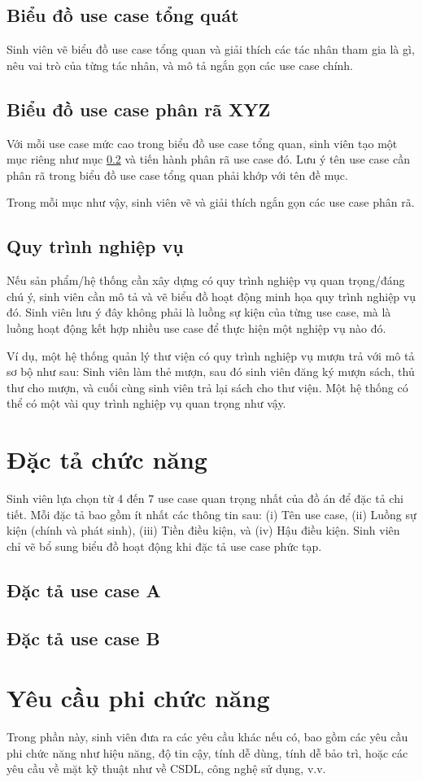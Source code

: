 \documentclass[../DoAn.tex]{subfiles}
\begin{document}
\subsection{Biểu đồ use case tổng quát}
\label{subsection:2.2.1}
Sinh viên vẽ biểu đồ use case tổng quan và giải thích các tác nhân tham gia là gì, nêu vai trò của từng tác nhân, và mô tả ngắn gọn các use case chính.

\subsection{Biểu đồ use case phân rã XYZ}
\label{subsection:2.2.2}
Với mỗi use case mức cao trong biểu đồ use case tổng quan, sinh viên tạo một mục riêng như mục \ref{subsection:2.2.2} và tiến hành phân rã use case đó. Lưu ý tên use case cần phân rã trong biểu đồ use case tổng quan phải khớp với tên đề mục.

Trong mỗi mục như vậy, sinh viên vẽ và giải thích ngắn gọn các use case phân rã.

\subsection{Quy trình nghiệp vụ}
\label{subsection:2.2.3}
Nếu sản phẩm/hệ thống cần xây dựng có quy trình nghiệp vụ quan trọng/đáng chú ý, sinh viên cần mô tả và vẽ biểu đồ hoạt động minh họa quy trình nghiệp vụ đó. Sinh viên lưu ý đây không phải là luồng sự kiện của từng use case, mà là luồng hoạt động kết hợp nhiều use case để thực hiện một nghiệp vụ nào đó.

Ví dụ, một hệ thống quản lý thư viện có quy trình nghiệp vụ mượn trả với mô tả sơ bộ như sau: Sinh viên làm thẻ mượn, sau đó sinh viên đăng ký mượn sách, thủ thư cho mượn, và cuối cùng sinh viên trả lại sách cho thư viện. Một hệ thống có thể có một vài quy trình nghiệp vụ quan trọng như vậy.
\section{Đặc tả chức năng}
\label{section:2.3}
Sinh viên lựa chọn từ 4 đến 7 use case quan trọng nhất của đồ án để đặc tả chi tiết. Mỗi đặc tả bao gồm ít nhất các thông tin sau: (i) Tên use case, (ii) Luồng sự kiện (chính và phát sinh), (iii) Tiền điều kiện, và (iv) Hậu điều kiện. Sinh viên chỉ vẽ bổ sung biểu đồ hoạt động khi đặc tả use case phức tạp.
\subsection{Đặc tả use case A}
\hfill
\subsection{Đặc tả use case B}
\hfill

\section{Yêu cầu phi chức năng}
\label{section:2.4}
Trong phần này, sinh viên đưa ra các yêu cầu khác nếu có, bao gồm các yêu cầu phi chức năng như hiệu năng, độ tin cậy, tính dễ dùng, tính dễ bảo trì, hoặc các yêu cầu về mặt kỹ thuật như về CSDL, công nghệ sử dụng, v.v.


\end{document}

